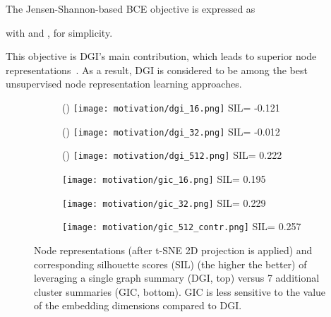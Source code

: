 \documentclass{article}
\begin{document}
The Jensen-Shannon-based BCE objective is expressed as

with  and , for simplicity.  

This objective is DGI's main contribution, which leads to superior node representations~\cite{velickovic2018deep}. As a result, DGI is considered to be among the best unsupervised node representation learning approaches. 


\begin{figure}
\begin{center}


        \begin{subfigure}[t]{0.2\columnwidth}
                \centering
                ()
                \texttt{[image: motivation/dgi\_16.png]}
                SIL= -0.121
        \end{subfigure}\begin{subfigure}[t]{0.2\columnwidth}
                \centering
                ()
                \texttt{[image: motivation/dgi\_32.png]}
                SIL= -0.012
        \end{subfigure}\begin{subfigure}[t]{0.2\columnwidth}
                \centering
                ()
                \texttt{[image: motivation/dgi\_512.png]}
                SIL= 0.222
        \end{subfigure}

        \begin{subfigure}[t]{0.2\columnwidth}
                \centering
                \texttt{[image: motivation/gic\_16.png]}
                SIL= 0.195
        \end{subfigure}\begin{subfigure}[t]{0.2\columnwidth}
                \centering
                \texttt{[image: motivation/gic\_32.png]}
                SIL= 0.229
        \end{subfigure}\begin{subfigure}[t]{0.2\columnwidth}
                \centering
                \texttt{[image: motivation/gic\_512\_contr.png]}
                SIL= 0.257
        \end{subfigure}\end{center}
\caption{Node representations (after t-SNE 2D projection is applied) and corresponding silhouette scores (SIL) (the higher the better) of leveraging a single graph summary (DGI, top) versus 7 additional cluster summaries (GIC, bottom). GIC is less sensitive to the value of the embedding dimensions  compared to DGI.}            
\label{figmotiv}
\end{figure}
\end{document}
